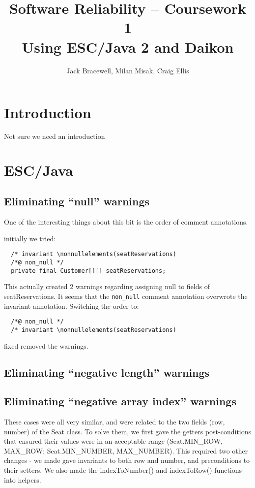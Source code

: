 \documentclass{article}
\title{Software Reliability -- Coursework 1 \\ Using ESC/Java 2 and Daikon}
\author{Jack Bracewell, Milan Misak, Craig Ellis}
\date{}
\begin{document}
\maketitle

\section{Introduction}

Not sure we need an introduction

\section{ESC/Java}

\subsection{Eliminating ``null'' warnings}

One of the interesting things about this bit is the order of comment annotations.

initially we tried:

\begin{verbatim}
  /* invariant \nonnullelements(seatReservations)
  /*@ non_null */
  private final Customer[][] seatReservations;
\end{verbatim}

This actually created 2 warnings regarding assigning null to fields of seatReservations. It seems that the
\verb|non_null| comment annotation overwrote the invariant annotation. Switching the order to:
\begin{verbatim}
  /*@ non_null */
  /* invariant \nonnullelements(seatReservations)
\end{verbatim}
fixed removed the warnings.

\subsection{Eliminating ``negative length'' warnings}

\subsection{Eliminating ``negative array index'' warnings}

These cases were all very similar, and were related to the two fields (row, number) of the Seat class. To solve them, we first gave the getters post-conditions that ensured their values were in an acceptable range (Seat.MIN\_ROW, MAX\_ROW; Seat.MIN\_NUMBER, MAX\_NUMBER). This required two other changes - we made gave invariants to both row and number, and preconditions to their setters. We also made the indexToNumber() and indexToRow() functions into helpers.
\end{document}

